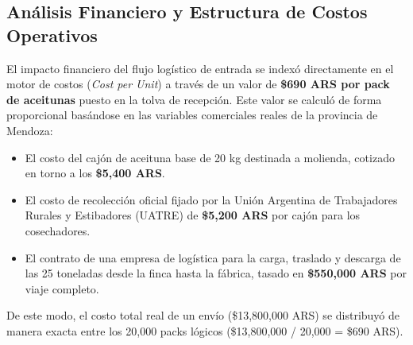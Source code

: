 \documentclass[runningheads]{llncs}
\begin{document}
\subsection{Análisis Financiero y Estructura de Costos Operativos}
El impacto financiero del flujo logístico de entrada se indexó directamente en el motor de costos (\textit{Cost per Unit}) a través de un valor de \textbf{\$690 ARS por pack de aceitunas} puesto en la tolva de recepción. Este valor se calculó de forma proporcional basándose en las variables comerciales reales de la provincia de Mendoza:
\begin{itemize}
    \item El costo del cajón de aceituna base de 20 kg destinada a molienda, cotizado en torno a los \textbf{\$5,400 ARS}.
    \item El costo de recolección oficial fijado por la Unión Argentina de Trabajadores Rurales y Estibadores (UATRE) de \textbf{\$5,200 ARS} por cajón para los cosechadores.
    \item El contrato de una empresa de logística para la carga, traslado y descarga de las 25 toneladas desde la finca hasta la fábrica, tasado en \textbf{\$550,000 ARS} por viaje completo.
\end{itemize}
De este modo, el costo total real de un envío (\$13,800,000 ARS) se distribuyó de manera exacta entre los 20,000 packs lógicos (\$13,800,000 / 20,000 = \$690 ARS).
\end{document}
